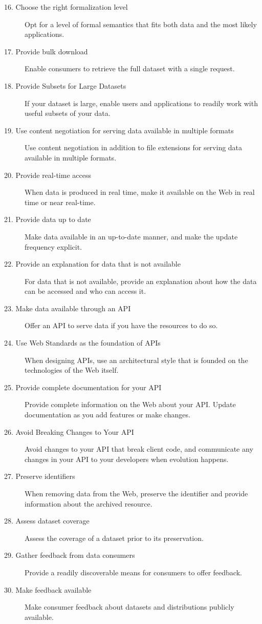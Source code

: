 \documentclass[a4paper,english,twoside,BCOR1.5cm,headsepline,DIV12,appendixprefix,final,12pt]{scrbook}
\begin{document}
\begin{description}
\item[16. Choose the right formalization level] Opt for a level of formal semantics that fits both data and the most likely applications.
\item[17. Provide bulk download] Enable consumers to retrieve the full dataset with a single request.
\item[18. Provide Subsets for Large Datasets] If your dataset is large, enable users and applications to readily work with useful subsets of your data.
\item[19. Use content negotiation for serving data available in multiple formats] Use content negotiation in addition to file extensions for serving data available in multiple formats.
\item[20. Provide real-time access] When data is produced in real time, make it available on the Web in real time or near real-time.
\item[21. Provide data up to date] Make data available in an up-to-date manner, and make the update frequency explicit.
\item[22. Provide an explanation for data that is not available] For data that is not available, provide an explanation about how the data can be accessed and who can access it.
\item[23. Make data available through an API] Offer an API to serve data if you have the resources to do so.
\item[24. Use Web Standards as the foundation of APIs] When designing APIs, use an architectural style that is founded on the technologies of the Web itself. 
\item[25. Provide complete documentation for your API] Provide complete information on the Web about your API. Update documentation as you add features or make changes.
\item[26. Avoid Breaking Changes to Your API] Avoid changes to your API that break client code, and communicate any changes in your API to your developers when evolution happens.
\item[27. Preserve identifiers] When removing data from the Web, preserve the identifier and provide information about the archived resource.
\item[28. Assess dataset coverage] Assess the coverage of a dataset prior to its preservation.
\item[29. Gather feedback from data consumers] Provide a readily discoverable means for consumers to offer feedback.
\item[30. Make feedback available] Make consumer feedback about datasets and distributions publicly available.

\end{description}
\end{document}
